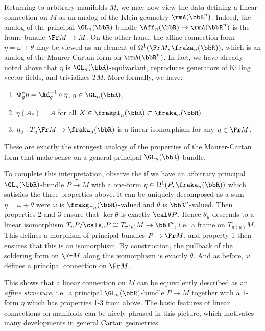 \begin{rem}
    Returning to arbitrary manifolds $M$, we may now view the data defining a linear connection on $M$ as an analog of the Klein geometry $\rmA(\bbR^n)$. Indeed, the analog of the principal $\GL_n(\bbR)$-bundle $\Aff_n(\bbR)\to \rmA(\bbR^n)$ is the frame bundle $\Fr M\to M$. On the other hand, the affine connection form $\eta=\omega+\theta$ may be viewed as an element of $\Omega^1(\Fr M,\fraka_n(\bbR))$, which is an analog of the Maurer-Cartan form on $\rmA(\bbR^n)$. In fact, we have already noted above that $\eta$ is $\GL_n(\bbR)$-equivariant, reproduces generators of Killing vector fields, and trivializes $TM$. More formally, we have:
    \begin{enumerate}
        \item $\Phi_g^\ast \eta=\Ad_g^{-1}\circ \eta$, $g\in\GL_n(\bbR)$,
        \item $\eta(A_\ast)=A$ for all $X\in\frakgl_n(\bbR)\subset\fraka_n(\bbR)$,
        \item $\eta_u:T_u\Fr M\to \fraka_n(\bbR)$ is a linear isomorphism for any $u\in\Fr M$.
    \end{enumerate}
    These are exactly the strongest analogs of the properties of the Maurer-Cartan form that make sense on a general principal $\GL_n(\bbR)$-bundle.

    To complete this interpretation, observe the if we have an arbitrary principal $\GL_n(\bbR)$-bundle $P\overset{\pi}{\to}M$ with a one-form $\eta\in\Omega^1(P,\fraka_n(\bbR))$ which satisfies the three properties above. It can be uniquely decomposed as a sum $\eta=\omega+\theta$ were $\omega$ is $\frakgl_n(\bbR)$-valued and $\theta$ is $\bbR^n$-valued. Then properties 2 and 3 ensure that $\ker\theta$ is exactly $\calV P$. Hence $\theta_u$ descends to a linear isomorphism $T_u P\slash \calV_u P\cong T_{\pi(u)}M\to \bbR^n$, i.e.\ a frame on $T_{\pi(u)}M$. This defines a morphism of principal bundles $P\to \Fr M$, and property 1 then ensures that this is an isomorphism. By construction, the pullback of the soldering form on $\Fr M$ along this isomorphism is exactly $\theta$. And as before, $\omega$ defines a principal connection on $\Fr M$.

    This shows that a linear connection on $M$ can be equivalently described as an \emph{affine structure}, i.e.\ a principal $\GL_n(\bbR)$-bundle $P\to M$ together with a $1$-form $\eta$ which has properties 1-3 from above. The basic features of linear connections on manifolds can be nicely phrased in this picture, which motivates many developments in general Cartan geometries.
\end{rem}



